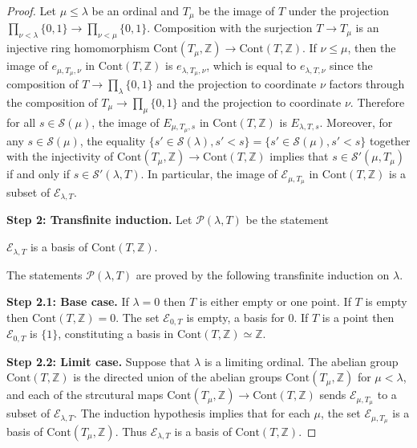 \begin{proof}
Let $ \mu \leq \lambda $ be an ordinal and $ T _{\mu} $ be the image of $ T $ under the projection
$ \prod _{\nu < \lambda} \{0, 1\} \to \prod _{\nu < \mu} \{0, 1\} $.
Composition with the surjection $ T\to T _{\mu} $ is an
injective ring homomorphism $ \mathrm{Cont}(T _{\mu}, \mathbb{Z})\to \mathrm{Cont}(T, \mathbb{Z}) $.
If $ \nu\leq \mu $, then the image of $ e _{\mu, T _{\mu}, \nu} $ in $ \mathrm{Cont}(T, \mathbb{Z}) $
is $ e _{\lambda, T _{\mu}, \nu} $, which is equal to $ e _{\lambda, T, \nu} $ since the composition of
$ T\to \prod _{\lambda} \{0, 1\} $ and the projection to coordinate $ \nu $ factors through
the composition of $ T _{\mu} \to \prod _{\mu} \{0, 1\} $ and the projection to coordinate $ \nu $.
Therefore for all $ s\in \mathcal{S}(\mu) $, the image of $ E _{\mu, T _{\mu}, s} $ in $ \mathrm{Cont}(T, \mathbb{Z}) $
is $ E _{\lambda, T, s} $.
Moreover, for any $ s\in \mathcal{S}(\mu) $, the equality $ \{s'\in \mathcal{S}(\lambda), s'<s\} = \{s'\in \mathcal{S}(\mu), s'<s\} $
together with the injectivity of $ \mathrm{Cont}(T _{\mu}, \mathbb{Z})\to \mathrm{Cont}(T, \mathbb{Z}) $
implies that $ s\in \mathcal{S}'(\mu, T _{\mu}) $ if and only if $ s\in \mathcal{S}'(\lambda, T) $.
In particular, the image of $ \mathscr{E}_{\mu, T _{\mu}} $ in $ \mathrm{Cont}(T, \mathbb{Z}) $
is a subset of $ \mathscr{E}_{\lambda, T} $.

\textbf{Step 2: Transfinite induction.}
Let $ \mathscr{P}(\lambda, T) $ be the statement
\begin{center}
$ \mathscr{E}_{\lambda, T} $ is a basis of $ \mathrm{Cont}(T, \mathbb{Z}) $.
\end{center}
The statements $ \mathscr{P}(\lambda, T) $ are proved by the following transfinite induction on $ \lambda $.

\textbf{Step 2.1: Base case.}
If $ \lambda = 0 $ then $ T $ is either empty or one point.
If $ T $ is empty then $ \mathrm{Cont}(T, \mathbb{Z}) = 0 $.
The set $ \mathscr{E}_{0, T} $ is empty, a basis for $ 0 $.
If $ T $ is a point then $ \mathscr{E}_{0, T} $ is $ \{1\} $, constituting a basis in
$ \mathrm{Cont}(T, \mathbb{Z}) \simeq \mathbb{Z} $.

\textbf{Step 2.2: Limit case.}
Suppose that $ \lambda $ is a limiting ordinal.
The abelian group $ \mathrm{Cont}(T, \mathbb{Z}) $ is the directed union of the abelian groups $ \mathrm{Cont}(T _{\mu}, \mathbb{Z}) $ for $ \mu < \lambda $,
and each of the strcutural maps $ \mathrm{Cont}(T _{\mu}, \mathbb{Z})\to \mathrm{Cont}(T, \mathbb{Z}) $
sends $ \mathscr{E}_{\mu, T _{\mu}} $ to a subset of $ \mathscr{E}_{\lambda, T} $.
The induction hypothesis implies that for each $ \mu $, the set $ \mathscr{E}_{\mu, T _{\mu}} $ is a basis of $ \mathrm{Cont}(T _{\mu}, \mathbb{Z}) $.
Thus $ \mathscr{E}_{\lambda, T} $ is a basis of $ \mathrm{Cont}(T, \mathbb{Z}) $.


\end{proof}

